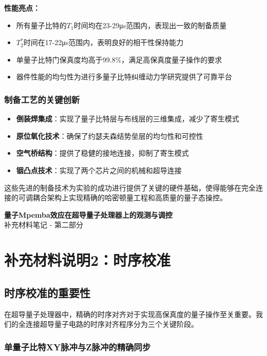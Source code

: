 \documentclass[11pt,a4paper]{article}
\begin{document}
\textbf{性能亮点：}
\begin{itemize}
    \item 所有量子比特的$T_1$时间均在23-29μs范围内，表现出一致的制备质量
    \item $T_2^*$时间在17-22μs范围内，表明良好的相干性保持能力
    \item 单量子比特门保真度均高于99.8\%，满足高保真度量子操作的要求
    \item 器件性能的均匀性为进行多量子比特纠缠动力学研究提供了可靠平台
\end{itemize}

\subsubsection{制备工艺的关键创新}

\begin{itemize}
    \item \textbf{倒装焊集成}：实现了量子比特层与布线层的三维集成，减少了寄生模式
    \item \textbf{原位氧化技术}：确保了约瑟夫森结势垒层的均匀性和可控性
    \item \textbf{空气桥结构}：提供了稳健的接地连接，抑制了寄生模式
    \item \textbf{铟凸点技术}：实现了两个芯片之间的机械和超导连接
\end{itemize}

这些先进的制备技术为实验的成功进行提供了关键的硬件基础，使得能够在完全连接的可调耦合架构上实现精确的哈密顿量工程和高质量的量子态操控。


\clearpage
\begin{center}
    {\LARGE \textbf{量子Mpemba效应在超导量子处理器上的观测与调控}} \\[6pt]
    {\large 补充材料笔记 - 第二部分}
\end{center}

\section*{补充材料说明2：时序校准}

\subsection{时序校准的重要性}

在超导量子处理器中，精确的时序对齐对于实现高保真度的量子操作至关重要。我们的全连接超导量子电路的时序对齐程序分为三个关键阶段。

\subsubsection{单量子比特XY脉冲与Z脉冲的精确同步}
\end{document}
